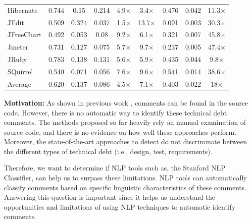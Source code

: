 \begin{table}[!thb]
\begin{center}
\begin{tabular}{l| c c c c c| c c c}
        Hibernate    &  0.744  &   0.15 & 0.214 &  4.9$\times$   &  3.4$\times$   & 0.476  &  0.042  & 11.3$\times$  \\
        JEdit        &  0.509  &  0.324 & 0.037 &  1.5$\times$   &  13.7$\times$  & 0.091  &  0.003  & 30.3$\times$  \\
        JFreeChart   &  0.492  &  0.053 &  0.08 &  9.2$\times$   &  6.1$\times$   & 0.321  &  0.007  & 45.8$\times$  \\
        Jmeter       &  0.731  &  0.127 & 0.075 &  5.7$\times$   &  9.7$\times$   & 0.237  &  0.005  & 47.4$\times$  \\
        JRuby        &  0.783  &  0.138 & 0.131 &  5.6$\times$   &  5.9$\times$   & 0.435  &  0.044  & 9.8$\times$   \\
        SQuirrel     &  0.540  &  0.071 & 0.056 &  7.6$\times$   &  9.6$\times$   & 0.541  &  0.014  & 38.6$\times$  \\
        \midrule 
        Average      &  0.620  & 0.137 & 0.086 &   4.5$\times$   & 7.1$\times$     & 0.403  &  0.022  & 18$\times$  \\ 
        \bottomrule
        \end{tabular}
    \end{center}    
\end{table}

\vspace{3mm}
\noindent\rqi
\vspace{3mm}

\noindent \textbf{Motivation:} As shown in previous work \cite{Potdar2014ICSME, Maldonado2015MTD}, \SATD comments can be found in the source code. However, there is no automatic way to identify these technical debt comments. The methods proposed so far heavily rely on manual examination of source code, and there is no evidence on how well these approaches perform. Moreover, the state-of-the-art approaches to detect \SATD do not discriminate between the different types of technical debt (i.e., design, test, requirements).

Therefore, we want to determine if NLP tools such as, the Stanford NLP Classifier, can help us to surpass these limitations. NLP tools can automatically classify comments based on specific linguistic characteristics of these comments. Answering this question is important since it helps us understand the opportunities and limitations of using NLP techniques to automatic identify \SATD comments. 



